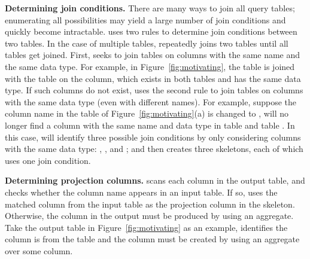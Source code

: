 \vspace{1mm}
{\textbf{Determining join conditions. }} There
are many ways to join all query tables; enumerating
all possibilities may yield a large number of
join conditions and quickly become intractable. \ourtool uses
two rules to determine join conditions between two tables.
In the case of
multiple tables, \ourtool repeatedly joins
two tables until all tables get joined.
First, \ourtool seeks to join
tables on columns with the
same name and the same data type. For example,
in Figure~\ref{fig:motivating}, the  table
is joined with the  table on the
 column, which exists in both
tables and has the same data type.
If such columns do not exist,
\ourtool uses the second rule to
join tables on columns with the same data type
(even with different names).
For example, suppose the column name 
in the  table of Figure~\ref{fig:motivating}(a)
is changed to , \ourtool will no longer
find a column with the same name and data type in
table  and table . In this case,
\ourtool will identify three possible join conditions
by only considering columns with the same data type:
, ,
and ; and then creates 
three skeletons, each of which uses one join condition. 

{\textbf{Determining projection columns.}} \ourtool
scans each column in the output table, and checks whether
the column name appears in an input table.
If so, \ourtool uses the matched column from the input
table as the projection column in the skeleton.
Otherwise, the column in the output must be produced by using an aggregate.
Take the output table in Figure~\ref{fig:motivating} as an
example, \ourtool identifies the  column
is from the  table and
the  column must be created by using
an aggregate over some column.





